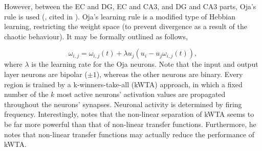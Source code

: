 However, between the EC and DG, EC and CA3, and DG and CA3 parts, Oja's rule is used (\cite{Hertz1991}, cited in \cite{Hattori2014}). Oja's learning rule is a modified type of Hebbian learning, restricting the weight space (to prevent divergence as a result of the chaotic behaviour). It may be formally outlined as follows,

\begin{equation}\label{ojas_rule}
    \omega_{i,j} = \omega_{i,j}(t) + \lambda u_j (u_i - u_j \omega_{i,j}(t)),
\end{equation}
where $\lambda$ is the learning rate for the Oja neurons. Note that the input and output layer neurons are bipolar ($\pm 1$), whereas the other neurons are binary. Every region is trained by a k-winners-take-all (kWTA) approach, in which a fixed number of the $k$ most active neurons' activation values are propagated throughout the neurons' synapses. Neuronal activity is determined by firing frequency. Interestingly, \citep{Hattori2014} notes that the non-linear separation of kWTA seems to be far more powerful than that of non-linear transfer functions. Furthermore, he notes that non-linear transfer functions may actually reduce the performance of kWTA.


